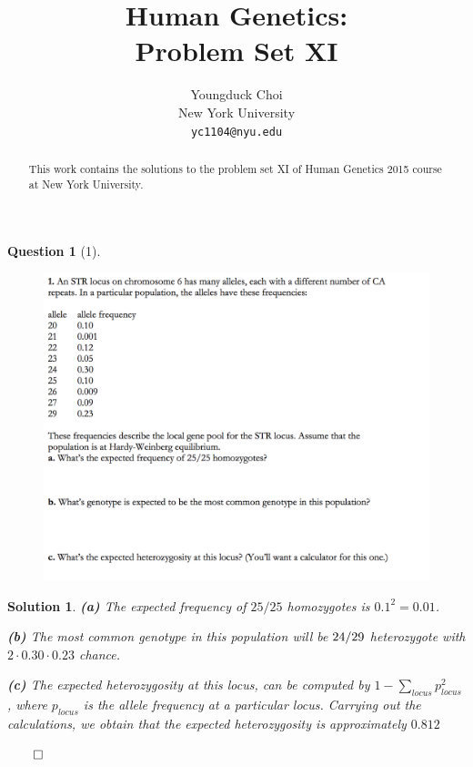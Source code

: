 \documentclass{article} %
\title{Human Genetics: \\
Problem Set XI}
\author{
Youngduck Choi \\
New York University\\
\texttt{yc1104@nyu.edu} \\
}
\theoremstyle{quest}
\newtheorem*{question}{Question}
\newtheorem*{solution}{Solution}
\begin{document}
\maketitle

\begin{abstract}
This work contains the solutions to the problem set XI
of Human Genetics 2015 course at New York University.
\end{abstract}

\bigskip

\begin{question}[1]
\hfill
\begin{figure}[h!]
  \centering
    \includegraphics[width=1\textwidth]{genetics-9-1.png}
\end{figure}
\end{question}
\newpage

\begin{solution}
\textbf{(a)} The expected frequency of $25/25$ homozygotes is $0.1^2 
= 0.01$.

\smallskip

\textbf{(b)} The most common genotype in this population will be
$24 \// 29$ heterozygote with $2\cdot 0.30 \cdot 0.23$ chance. 

\smallskip

\textbf{(c)} The expected heterozygosity at this locus, can be
computed by $1 - \sum_{locus} p_{locus}^2$, where $p_{locus}$
is the allele frequency at a particular locus. Carrying out the
calculations, we obtain that the expected heterozygosity is approximately  
$0.812$

\hfill $\qed$

\end{solution}
\end{document}
